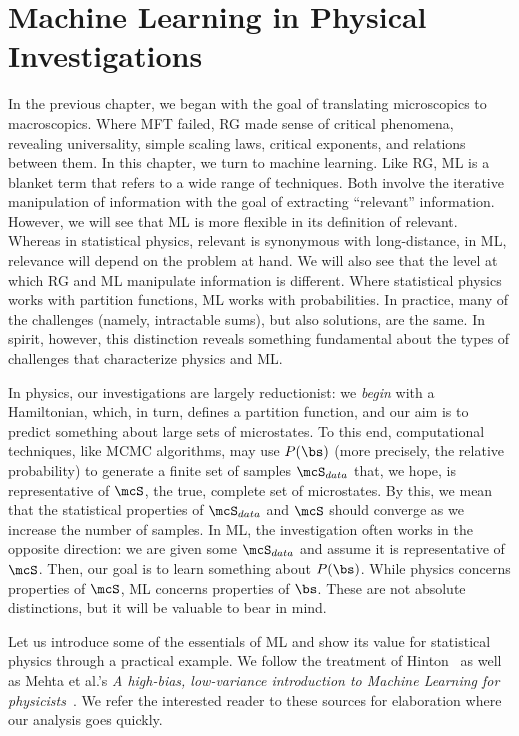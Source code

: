 \chapter{Machine Learning in Physical Investigations}\label{sec:ml}
In the previous chapter, we began with the goal of translating
microscopics to macroscopics. Where MFT failed, RG made sense of
critical phenomena, revealing universality, simple scaling laws,
critical exponents, and relations between them. In this chapter, we
turn to machine learning.  Like RG, ML is a blanket term that refers
to a wide range of techniques. Both involve the iterative manipulation
of information with the goal of extracting ``relevant''
information. However, we will see that ML is more flexible in its
definition of relevant. Whereas in statistical physics, relevant is
synonymous with long-distance, in ML, relevance will depend on the
problem at hand. We will also see that the level at which RG and ML
manipulate information is different. Where statistical physics works
with partition functions, ML works with probabilities. In practice,
many of the challenges (namely, intractable sums), but also solutions,
are the same. In spirit, however, this distinction reveals something
fundamental about the types of challenges that characterize physics
and ML\@.

In physics, our investigations are largely reductionist: we
\textit{begin} with a Hamiltonian, which, in turn, defines a partition
function, and our aim is to predict something about large sets of
microstates. To this end, computational techniques, like MCMC
algorithms, may use $P(\bs)$ (more precisely, the relative
probability) to generate a finite set of samples $\mcS_{data}$ that,
we hope, is representative of $\mcS$, the true, complete set of
microstates. By this, we mean that the statistical properties of
$\mcS_{data}$ and $\mcS$ should converge as we increase the number of
samples. In ML, the investigation often works in the opposite
direction: we are given some $\mcS_{data}$ and assume it is
representative of $\mcS$. Then, our goal is to learn something about
$P(\bs)$. While physics concerns properties of $\mcS$, ML concerns
properties of $\bs$. These are not absolute distinctions, but it will
be valuable to bear in mind.

Let us introduce some of the essentials of ML and show its value for
statistical physics through a practical example. We follow the
treatment of Hinton~\cite{hinton} as well as Mehta et al.'s \textit{A high-bias, low-variance
  introduction to Machine Learning for
  physicists}~\cite{mehta-review}. We refer the interested reader to
these sources for elaboration where our analysis goes quickly.

